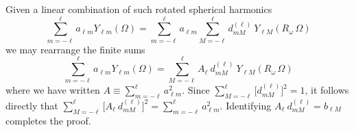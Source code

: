 \documentclass[aps,prl,preprint,groupedaddress]{revtex4-1}
\begin{document}
Given a linear combination of such rotated spherical harmonics
\[
\sum_{m=-\ell}^{\ell} a_{\ell m} Y_{\ell m} (\Omega) = \sum_{m=-\ell}^{\ell} a_{\ell m} \sum_{M=-\ell}^{\ell} d^{(\ell)}_{mM} \> Y_{\ell M} ( R_\omega \, \Omega )
\]
we may rearrange the finite sums
\[
\sum_{m=-\ell}^{\ell} a_{\ell m} Y_{\ell m} (\Omega) = \sum_{M=-\ell}^{\ell} A_\ell \> d^{(\ell)}_{mM} \> Y_{\ell M} ( R_\omega \, \Omega )
\]
where we have written $A \equiv \sum_{m=-\ell}^\ell a_{\ell m}^2$. Since $\sum_{M=-\ell}^{\ell} \big[ d^{(\ell)}_{mM} \big]^2 = 1$, it follows directly that $\sum_{M=-\ell}^{\ell} \big[ A_\ell \> d^{(\ell)}_{mM} \big]^2 = \sum_{m=-\ell}^\ell a_{\ell m}^2$. Identifying $A_{\ell} \> d^{(\ell)}_{mM} = b_{\ell M}$ completes the proof.









\end{document}
